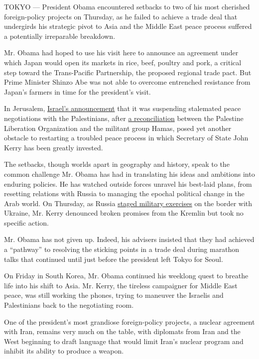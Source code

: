 TOKYO --- President Obama encountered setbacks to two of his most
cherished foreign-policy projects on Thursday, as he failed to achieve a
trade deal that undergirds his strategic pivot to Asia and the Middle
East peace process suffered a potentially irreparable breakdown.

Mr. Obama had hoped to use his visit here to announce an agreement under
which Japan would open its markets in rice, beef, poultry and pork, a
critical step toward the Trans-Pacific Partnership, the proposed
regional trade pact. But Prime Minister Shinzo Abe was not able to
overcome entrenched resistance from Japan's farmers in time for the
president's visit.

In Jerusalem,
\href{http://www.nytimes3xbfgragh.onion/2014/04/25/world/middleeast/israel.html}{Israel's
announcement} that it was suspending stalemated peace negotiations with
the Palestinians, after
\href{http://www.nytimes3xbfgragh.onion/2014/04/24/world/middleeast/palestinian-factions-announce-deal-on-unity-government.html}{a
reconciliation} between the Palestine Liberation Organization and the
militant group Hamas, posed yet another obstacle to restarting a
troubled peace process in which Secretary of State John Kerry has been
greatly invested.

The setbacks, though worlds apart in geography and history, speak to the
common challenge Mr. Obama has had in translating his ideas and
ambitions into enduring policies. He has watched outside forces unravel
his best-laid plans, from resetting relations with Russia to managing
the epochal political change in the Arab world. On Thursday, as Russia
\href{http://www.nytimes3xbfgragh.onion/2014/04/25/world/europe/ukraine-crisis.html}{staged
military exercises} on the border with Ukraine, Mr. Kerry denounced
broken promises from the Kremlin but took no specific action.

Mr. Obama has not given up. Indeed, his advisers insisted that they had
achieved a ``pathway'' to resolving the sticking points in a trade deal
during marathon talks that continued until just before the president
left Tokyo for Seoul.

On Friday in South Korea, Mr. Obama continued his weeklong quest to
breathe life into his shift to Asia. Mr. Kerry, the tireless campaigner
for Middle East peace, was still working the phones, trying to maneuver
the Israelis and Palestinians back to the negotiating room.

One of the president's most grandiose foreign-policy projects, a nuclear
agreement with Iran, remains very much on the table, with diplomats from
Iran and the West beginning to draft language that would limit Iran's
nuclear program and inhibit its ability to produce a weapon.

